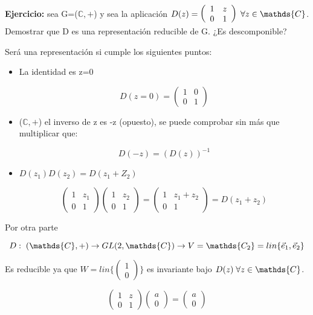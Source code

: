 \textbf{Ejercicio:} sea G=($\mathds{C},+$) y sea la aplicación $D(z)=\left ( \begin{array}{cc}
1 & z \\
0 & 1
\end{array} \right ) \hspace{0.1cm} \forall z\in \mathds{C}$. Demostrar que D es una representación reducible de G. ¿Es descomponible?

\bigskip
Será una representación si cumple los siguientes puntos:

\begin{itemize}
\item La identidad es z=0

$$D(z=0)=\left ( \begin{array}{cc}
1 &  0\\
0 & 1
\end{array} \right )$$

\item  ($\mathds{C},+$) el inverso de z es -z (opuesto), se puede comprobar sin más que multiplicar que:

$$D(-z)=(D(z))^{-1}$$

\item $D(z_1)D(z_2)=D(z_1+Z_2)$

$$\left ( \begin{array}{cc}
1 & z_1 \\
0 & 1
\end{array}\right)\left ( \begin{array}{cc}
1 & z_2 \\
0 & 1
\end{array}\right)=\left ( \begin{array}{cc}
1 & z_1 +z_2 \\
0 & 1
\end{array}\right)=D(z_1+z_2)$$
\end{itemize}

Por otra parte

$$D: \hspace{0.1cm} (\mathds{C},+)\to GL(2, \mathds{C}) \to V=\mathds{C_2}=lin \lbrace \Vec{e}_1,\Vec{e}_2\rbrace$$

Es reducible ya que $W= lin \lbrace \left ( \begin{array}{c}
1  \\
0
\end{array}\right) \rbrace$ es invariante bajo $D(z)\hspace{0.1cm} \forall z \in \mathds{C}$.

$$\left ( \begin{array}{cc}
1 & z \\
0 & 1
\end{array}\right) \left( \begin{array}{c}
a  \\
0
\end{array}\right)=  \left( \begin{array}{c}
a  \\
0
\end{array}\right)$$

